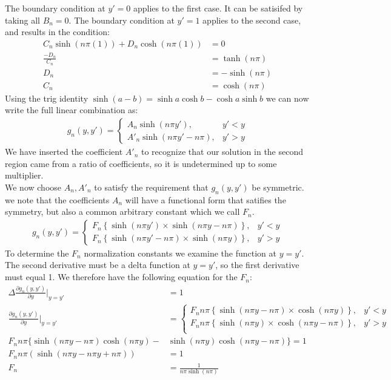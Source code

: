 \documentclass[a4paper,11pt]{article}
\numberwithin{equation}{section}
\newcommand{\lrp}[1]{\left({#1}\right)}
\newcommand{\lrb}[1]{\left\{{#1}\right\}}
\begin{document}
The boundary condition at $y'=0$ applies to the first case. 
It can be satisifed by taking all $B_n=0$.
The boundary condition at $y'=1$ applies to the second case, and results in the condition:
\begin{align}
 C_n\sinh{(n\pi (1))}+D_n\cosh{(n\pi (1))} &= 0\\
 \frac{-D_n}{C_n} &= \tanh{(n\pi)}\\
 D_n &= -\sinh{(n\pi)}\\
 C_n &= \cosh{(n\pi)}
\end{align}
Using the trig identity $\sinh{(a-b)}=\sinh{a}\cosh{b}-\cosh{a}\sinh{b}$ we can now write the full linear combination as:
\begin{align}
 g_n(y,y') = \begin{cases}
              A_n\sinh{(n\pi y')},&y'<y\\
              A'_n\sinh{(n\pi y' - n\pi)},&y'>y
             \end{cases}
\end{align}
We have inserted the coefficient $A'_n$ to recognize that our solution in the second region came from a ratio of coefficients, so it is undetermined up to some multiplier.\\
We now choose $A_n,A'_n$ to satisfy the requirement that $g_n(y,y')$ be symmetric. 
we note that the coefficients $A_n$ will have a functional form that satifies the symmetry, but also a common arbitrary constant which we call $F_n$.
\begin{align}
 g_n(y,y') = \begin{cases}
              F_n\lrb{\sinh{(n\pi y')}\times\sinh{(n\pi y - n\pi)}},&y'<y\\
              F_n\lrb{\sinh{(n\pi y' - n\pi)}\times\sinh{(n\pi y)}},&y'>y
             \end{cases}
\end{align}
To determine the $F_n$ normalization constants we examine the function at $y=y'$.
The second derivative must be a delta function at $y=y'$, so the first derivative must equal 1.
We therefore have the following equation for the $F_n$:
\begin{align}
 \Delta \frac{\partial g_n(y,y')}{\partial y}|_{y=y'} &= 1\\
 \frac{\partial g_n(y,y')}{\partial y}|_{y=y'} &= \begin{cases}
						  F_nn\pi\lrb{\sinh{(n\pi y-n\pi)}\times\cosh{(n\pi y)}},&y'<y\\
						  F_nn\pi\lrb{\sinh{(n\pi y)}\times\cosh{(n\pi y-n\pi)}},&y'>y\\
						\end{cases}\\
 F_nn\pi\{\sinh{(n\pi y-n\pi)}\cosh{(n\pi y)}-&\sinh{(n\pi y)}\cosh{(n\pi y-n\pi)}\} = 1\\
 F_nn\pi(\sinh{\lrp{n\pi y-n\pi y +n\pi}} ) &= 1\\
 F_n &= \frac{1}{n\pi\sinh{(n\pi)}}
\end{align}
\end{document}
